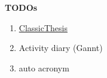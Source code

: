 \centerline{\huge\bfseries TODOs}

\begin{enumerate}[label=(\arabic*)]
    \item \href{http://miede.de}{ClassicThesis}
    \item Activity diary (Gannt)
    \item auto acronym
\end{enumerate}
